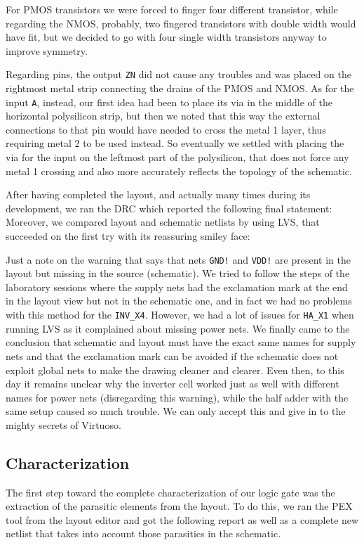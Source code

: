 \documentclass[a4paper]{article}
\newcommand{\inv}{\texttt{INV\_X4}\xspace}
\newcommand{\ha}{\texttt{HA\_X1}\xspace}
\begin{document}
For PMOS transistors we were forced to finger four different transistor, while regarding the NMOS, probably, two fingered transistors with double width would have fit, but we decided to go with four single width transistors anyway to improve symmetry.

Regarding pins, the output \texttt{ZN} did not cause any troubles and was placed on the rightmost metal strip connecting the drains of the PMOS and NMOS. As for the input \texttt{A}, instead, our first idea had been to place its via in the middle of the horizontal polysilicon strip, but then we noted that this way the external connections to that pin would have needed to cross the metal 1 layer, thus requiring metal 2 to be used instead. So eventually we settled with placing the via for the input on the leftmost part of the polysilicon, that does not force any metal 1 crossing and also more accurately reflects the topology of the schematic.

After having completed the layout, and actually many times during its development, we ran the DRC which reported the following final statement:
\newpage
{}
\newpage
Moreover, we compared layout and schematic netlists by using LVS, that succeeded on the first try with its reassuring smiley face:

Just a note on the warning that says that nets \texttt{GND!} and \texttt{VDD!} are present in the layout but missing in the source (schematic). We tried to follow the steps of the laboratory sessions where the supply nets had the exclamation mark at the end in the layout view but not in the schematic one, and in fact we had no problems with this method for the \inv. However, we had a lot of issues for \ha when running LVS as it complained about missing power nets. We finally came to the conclusion that schematic and layout must have the exact same names for supply nets and that the exclamation mark can be avoided if the schematic does not exploit global nets to make the drawing cleaner and clearer. Even then, to this day it remains unclear why the inverter cell worked just as well with different names for power nets (disregarding this warning), while the half adder with the same setup caused so much trouble. We can only accept this and give in to the mighty secrets of Virtuoso.


\subsection{Characterization}
The first step toward the complete characterization of our logic gate was the extraction of the parasitic elements from the layout. To do this, we ran the PEX tool from the layout editor and got the following report as well as a complete new netlist that takes into account those parasitics in the schematic.
\end{document}
